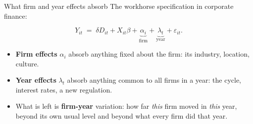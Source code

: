 \documentclass[
  11pt,
  ignorenonframetext,
  aspectratio=169,
]{beamer}
\providecommand{\tightlist}{%
  \setlength{\itemsep}{0pt}\setlength{\parskip}{0pt}}
\begin{document}
\begin{frame}{What firm and year effects absorb}
\protect{}\label{what-firm-and-year-effects-absorb}
The workhorse specification in corporate finance:

\[
Y_{it} \;=\; \delta D_{it} + X_{it}\beta + \underbrace{\alpha_i}_{\text{firm}} + \underbrace{\lambda_t}_{\text{year}} + \varepsilon_{it} .
\]

\begin{itemize}
\tightlist
\item
  \textbf{Firm effects} \(\alpha_i\) absorb anything fixed about the
  firm: its industry, location, culture.
\item
  \textbf{Year effects} \(\lambda_t\) absorb anything common to all
  firms in a year: the cycle, interest rates, a new regulation.
\item
  What is left is \textbf{firm-year} variation: how far \emph{this} firm
  moved in \emph{this} year, beyond its own usual level and beyond what
  every firm did that year.
\end{itemize}
\end{frame}
\end{document}
